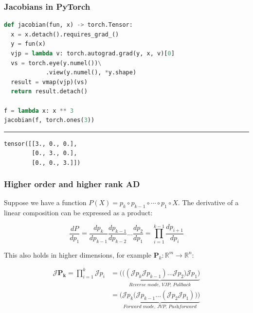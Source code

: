 \documentclass{beamer}
\begin{document}
    \begin{frame}[fragile]
        \frametitle{Jacobians in PyTorch}
        \begin{lstlisting}[language=Python, linewidth=1.1\linewidth]
def jacobian(fun, x) -> torch.Tensor:
  x = x.detach().requires_grad_()
  y = fun(x)
  vjp = lambda v: torch.autograd.grad(y, x, v)[0]
  vs = torch.eye(y.numel())\
            .view(y.numel(), *y.shape)
  result = vmap(vjp)(vs)
  return result.detach()

f = lambda x: x ** 3
jacobian(f, torch.ones(3))
        \end{lstlisting}

        \noindent\rule{1.03\textwidth}{0.5pt}

        \begin{lstlisting}
tensor([[3., 0., 0.],
        [0., 3., 0.],
        [0., 0., 3.]])
        \end{lstlisting}
    \end{frame}

    \begin{frame}
        \frametitle{Higher order and higher rank AD}

        Suppose we have a function $P(X) = p_k \circ p_{k-1} \circ \cdots \circ p_1 \circ X$. The derivative of a linear composition can be expressed as a product:

        \begin{equation*}
            \label{eq:sfun_chain_rule}
            \frac{dP}{dp_1} = \frac{dp_k}{dp_{k-1}}\frac{dp_{k-1}}{dp_{k-2}}\dots\frac{dp_2}{dp_1}= {\displaystyle \prod_{i=1}^{k-1} \frac{dp_{i+1}}{dp_{i}}}
        \end{equation*}

        This also holds in higher dimensions, for example $\mathbf{P}_k: \mathbb{R}^m\rightarrow\mathbb{R}^n$:

        \begin{align*}
            \label{eq:vfun_chain_rule}
            \mathcal{J} \mathbf{P_k} = \displaystyle \prod_{i=1}^{k} \mathcal{J}p_i &= \underbrace{\bigg(\Big((\mathcal{J}p_k \mathcal{J}p_{k-1}) \dots \mathcal{J}p_2\Big) \mathcal{J}p_1\bigg)}_{\textit{Reverse mode, VJP, Pullback}} \\
            &= \underbrace{\bigg(\mathcal{J}p_k \Big(\mathcal{J}p_{k-1} \dots (\mathcal{J}p_2 \mathcal{J}p_1)\Big)\bigg)}_{\textit{Forward mode, JVP, Pushforward}}
        \end{align*}
    \end{frame}
\end{document}
